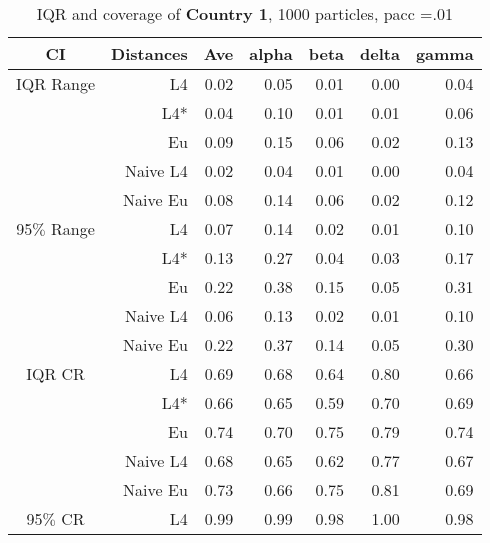 \documentclass[a4paper,12pt,twoside]{book}
\begin{document}
\begin{table}[H]
\centering
\caption{IQR and coverage of \textbf{Country 1}, 1000 particles, pacc =.01}

\begin{tabular}{crrrrrr}
  \hline
{\color{blue}CI} & Distances & Ave & alpha & beta & delta & gamma \\ 
  \hline
{\color{blue}IQR Range} & L4  &0.02 & 0.05 & 0.01 & 0.00 & 0.04 \\ 
  
&L4*  &0.04 & 0.10 & 0.01 & 0.01 & 0.06 \\ 
  
&Eu &     0.09 & 0.15 & 0.06 & 0.02 & 0.13 \\ 
   
&Naive L4& 0.02 & 0.04 & 0.01 & 0.00 & 0.04 \\
  
&Naive Eu &  0.08 & 0.14 & 0.06 & 0.02 & 0.12 \\ 
 
  
    {\color{blue}95$\%$ Range} & L4  &0.07 & 0.14 & 0.02 & 0.01 & 0.10 \\ 

    &L4*  &  0.13 & 0.27 & 0.04 & 0.03 & 0.17 \\ 
   
&Eu &  0.22 & 0.38 & 0.15 & 0.05 & 0.31 \\ 
  
&Naive L4&    0.06 & 0.13 & 0.02 & 0.01 & 0.10 \\
 
&Naive Eu &   0.22 & 0.37 & 0.14 & 0.05 & 0.30 \\ 
  
   \hline
   
{\color{blue} IQR CR } & L4  &0.69 & 0.68 & 0.64 & 0.80 & 0.66 \\ 
  

&L4*  &  0.66 & 0.65 & 0.59 & 0.70 & 0.69 \\ 
  
 
&Eu &    0.74 & 0.70 & 0.75 & 0.79 & 0.74 \\ 
  
  
&Naive L4&   0.68 & 0.65 & 0.62 & 0.77 & 0.67 \\  
&Naive Eu & 0.73 & 0.66 & 0.75 & 0.81 & 0.69 \\ 
  

 {\color{blue} 95$\%$ CR }& L4  &0.99 & 0.99 & 0.98 & 1.00 & 0.98 \\ 
  

\end{tabular}
\end{table}
\end{document}
